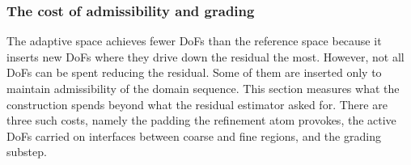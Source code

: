 \documentclass[a4paper, 12pt]{article}
\theoremstyle{definition}
\theoremstyle{plain}
\numberwithin{equation}{section}
\begin{document}
\subsubsection{The cost of admissibility and grading}
\label{subsubsec:cl_performance}

The adaptive space achieves fewer DoFs than the reference space because it inserts new DoFs where they drive down the residual the most. However, not all DoFs can be spent reducing the residual. Some of them are inserted only to maintain admissibility of the domain sequence. This section measures what the construction spends beyond what the residual estimator asked for. There are three such costs, namely the padding the refinement atom provokes, the active DoFs carried on interfaces between coarse and fine regions, and the grading substep.
\end{document}
